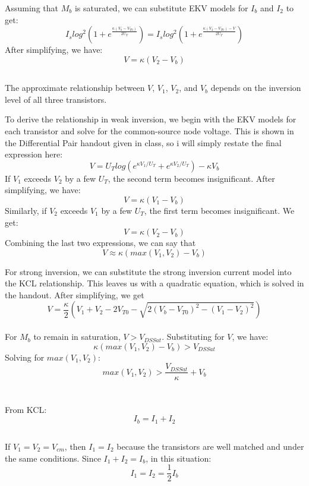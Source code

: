 \documentclass{article}
\begin{document}
Assuming that $M_b$ is saturated, we can substitute EKV models for $I_b$ and $I_2$ to get: \[I_slog^2(1+e^{\frac{\kappa(V_{b}-V_{T0})}{2U_T}})=I_slog^2(1+e^{\frac{\kappa(V_{2}-V_{T0})-V}{2U_T}})\]
After simplifying, we have: \[V=\kappa(V_2-V_b)\]
\subsection{}
The approximate relationship between $V$, $V_1$, $V_2$, and $V_b$ depends on the inversion level of all three transistors. 

To derive the relationship in weak inversion, we begin with the EKV models for each transistor and solve for the common-source node voltage. This is shown in the Differential Pair handout given in class, so i will simply restate the final expression here: \[V=U_Tlog(e^{\kappa V_1/U_T}+e^{\kappa V_2/U_T})-\kappa V_b\] 
If $V_1$ exceeds $V_2$ by a few $U_T$, the second term becomes insignificant. After simplifying, we have: \[V=\kappa(V_1-V_b)\]
Similarly, if $V_2$ exceeds $V_1$ by a few $U_T$, the first term becomes insignificant. We get: \[V=\kappa(V_2-V_b)\]
Combining the last two expressions, we can say that \[V \approx \kappa(max(V_1,V_2)-V_b)\]

For strong inversion, we can substitute the strong inversion current model into the KCL relationship. This leaves us with a quadratic equation, which is solved in the handout. After simplifying, we get \[V=\frac{\kappa}{2}(V_1+V_2-2V_{T0}-\sqrt{2(V_b-V_{T0})^2-(V_1-V_2)^2})\]\\
For $M_b$ to remain in saturation, $V>V_{DSSat}$. Substituting for $V$, we have: \[\kappa(max(V_1,V_2)-V_b)>V_{DSSat}\]
Solving for $max(V_1,V_2)$: \[max(V_1,V_2)>\frac{V_{DSSat}}{\kappa}+V_b\]

\section{}
\subsection{}
From KCL: \[I_b=I_1+I_2\]
\subsection{}
If $V_1=V_2=V_{cm}$, then $I_1=I_2$ because the transistors are well matched and under the same conditions. Since $I_1+I_2=I_b$, in this situation: \[I_1=I_2=\frac{1}{2}I_b\]
\end{document}
